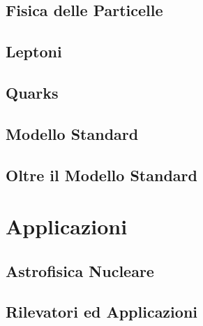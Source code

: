 \documentclass[a4paper, 12pt, openany]{book}
\begin{document}
\chapter{Fisica delle Particelle}


\chapter{Leptoni}


\chapter{Quarks}


\chapter{Modello Standard}


\chapter{Oltre il Modello Standard}


\part{Applicazioni}
\pagestyle{body}

\chapter{Astrofisica Nucleare}


\chapter{Rilevatori ed Applicazioni}

\end{document}
